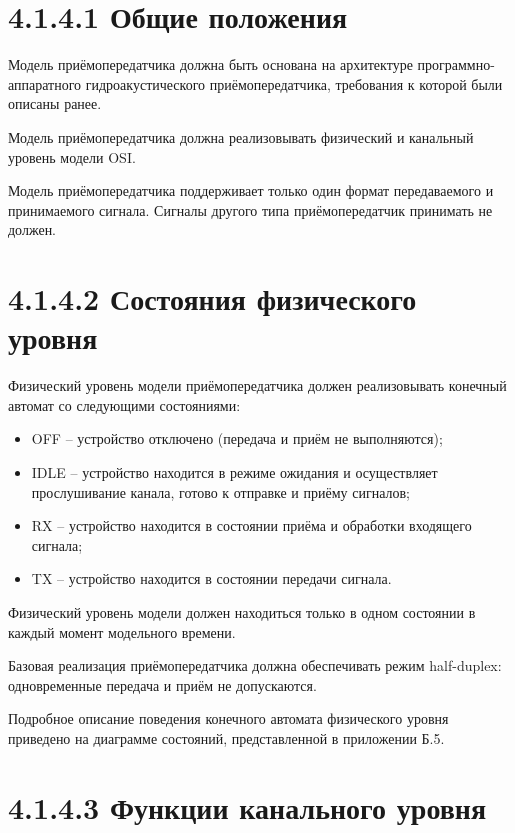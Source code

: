 \hl{}

\section{4.1.4.1 Общие
положения}\label{ux43eux431ux449ux438ux435-ux43fux43eux43bux43eux436ux435ux43dux438ux44f}

Модель приёмопередатчика должна быть основана на архитектуре
программно-аппаратного гидроакустического приёмопередатчика, требования
к которой были описаны ранее.

Модель приёмопередатчика должна реализовывать физический и канальный
уровень модели OSI.

Модель приёмопередатчика поддерживает только один формат передаваемого и
принимаемого сигнала. Сигналы другого типа приёмопередатчик принимать не
должен.

\section{4.1.4.2 Состояния физического
уровня}\label{ux441ux43eux441ux442ux43eux44fux43dux438ux44f-ux444ux438ux437ux438ux447ux435ux441ux43aux43eux433ux43e-ux443ux440ux43eux432ux43dux44f}

Физический уровень модели приёмопередатчика должен реализовывать
конечный автомат со следующими состояниями:

\begin{itemize}
\item
  OFF -- устройство отключено (передача и приём не выполняются);
\item
  IDLE -- устройство находится в режиме ожидания и осуществляет
  прослушивание канала, готово к отправке и приёму сигналов;
\item
  RX -- устройство находится в состоянии приёма и обработки входящего
  сигнала;
\item
  TX -- устройство находится в состоянии передачи сигнала.
\end{itemize}

Физический уровень модели должен находиться только в одном состоянии в
каждый момент модельного времени.

Базовая реализация приёмопередатчика должна обеспечивать режим
half-duplex: одновременные передача и приём не допускаются.

Подробное описание поведения конечного автомата физического уровня
приведено на диаграмме состояний, представленной в приложении Б.5.

\section{4.1.4.3 Функции канального
уровня}\label{ux444ux443ux43dux43aux446ux438ux438-ux43aux430ux43dux430ux43bux44cux43dux43eux433ux43e-ux443ux440ux43eux432ux43dux44f}

